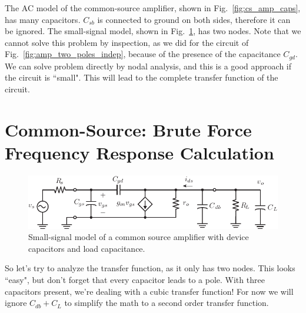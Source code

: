 The AC model of the common-source amplifier, shown in Fig.~\ref{fig:cs_amp_caps}, has many capacitors.  
 $C_{sb}$ is connected to ground on both sides, therefore it can be ignored.  The small-signal model, shown in Fig.~\ref{fig:cs_amp_ac_caps}, has two nodes.  Note that we cannot solve this problem by inspection, as we did for the circuit of Fig.~\ref{fig:amp_two_poles_indep}, because of the presence of the capacitance $C_{gd}$. We can solve problem directly by nodal analysis, and this is a good approach if the circuit is ``small".  This will lead to the complete transfer function of the circuit.
 



\section{Common-Source:  Brute Force Frequency Response Calculation}




\begin{figure}[tb]
\begin{center}
\includegraphics[scale=1]{cs_amp_ac_caps}
\end{center}
\caption{Small-signal model of a common source amplifier with device capacitors and load capacitance.} \label{fig:cs_amp_ac_caps}
\end{figure}

So let's try to analyze the transfer function, as it only has two nodes.  This looks ``easy", but don't forget that every capacitor leads to a pole.  With three capacitors present, we're dealing with a cubic transfer function! For now we will ignore $C_{db}+C_L$ to simplify the math to a second order transfer function.  

